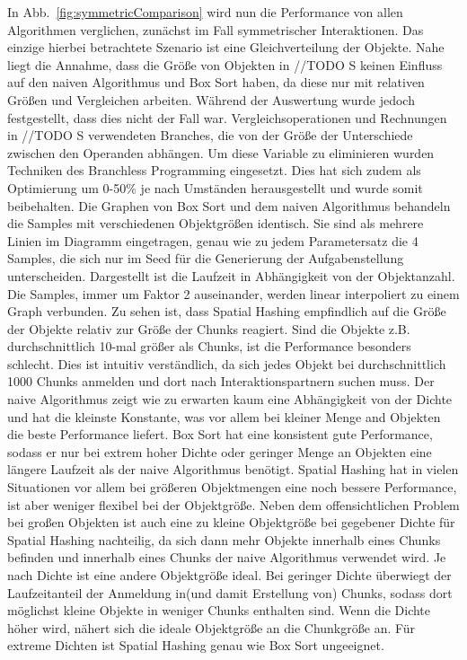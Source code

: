 In Abb.~\ref{fig:symmetricComparison} wird nun die Performance von allen Algorithmen verglichen, zunächst im Fall symmetrischer Interaktionen. Das einzige hierbei betrachtete Szenario ist eine Gleichverteilung der Objekte. Nahe liegt die Annahme, dass die Größe von Objekten in //TODO S keinen Einfluss auf den naiven Algorithmus und Box Sort haben, da diese nur mit relativen Größen und Vergleichen arbeiten. Während der Auswertung wurde jedoch festgestellt, dass dies nicht der Fall war. Vergleichsoperationen und Rechnungen in //TODO S verwendeten Branches, die von der Größe der Unterschiede zwischen den Operanden abhängen. Um diese Variable zu eliminieren wurden Techniken des Branchless Programming eingesetzt. Dies hat sich zudem als Optimierung um 0-50\% je nach Umständen herausgestellt und wurde somit beibehalten. Die Graphen von Box Sort und dem naiven Algorithmus behandeln die Samples mit verschiedenen Objektgrößen identisch. Sie sind als mehrere Linien im Diagramm eingetragen, genau wie zu jedem Parametersatz die 4 Samples, die sich nur im Seed für die Generierung der Aufgabenstellung unterscheiden. Dargestellt ist die Laufzeit in Abhängigkeit von der Objektanzahl. Die Samples, immer um Faktor 2 auseinander, werden linear interpoliert zu einem Graph verbunden. Zu sehen ist, dass Spatial Hashing empfindlich auf die Größe der Objekte relativ zur Größe der Chunks reagiert. Sind die Objekte z.B. durchschnittlich 10-mal größer als Chunks, ist die Performance besonders schlecht. Dies ist intuitiv verständlich, da sich jedes Objekt bei durchschnittlich 1000 Chunks anmelden und dort nach Interaktionspartnern suchen muss. Der naive Algorithmus zeigt wie zu erwarten kaum eine Abhängigkeit von der Dichte und hat die kleinste Konstante, was vor allem bei kleiner Menge and Objekten die beste Performance liefert. Box Sort hat eine konsistent gute Performance, sodass er nur bei extrem hoher Dichte oder geringer Menge an Objekten eine längere Laufzeit als der naive Algorithmus benötigt. Spatial Hashing hat in vielen Situationen vor allem bei größeren Objektmengen eine noch bessere Performance, ist aber weniger flexibel bei der Objektgröße. Neben dem offensichtlichen Problem bei großen Objekten ist auch eine zu kleine Objektgröße bei gegebener Dichte für Spatial Hashing nachteilig, da sich dann mehr Objekte innerhalb eines Chunks befinden und innerhalb eines Chunks der naive Algorithmus verwendet wird. Je nach Dichte ist eine andere Objektgröße ideal. Bei geringer Dichte überwiegt der Laufzeitanteil der Anmeldung in(und damit Erstellung von) Chunks, sodass dort möglichst kleine Objekte in weniger Chunks enthalten sind. Wenn die Dichte höher wird, nähert sich die ideale Objektgröße an die Chunkgröße an. Für extreme Dichten ist Spatial Hashing genau wie Box Sort ungeeignet.\\



